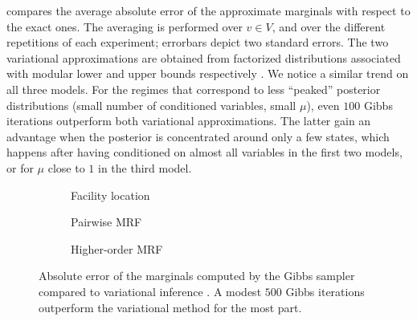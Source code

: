  compares the average absolute error of the approximate marginals with respect to the exact ones.
The averaging is performed over $v \in V$, and over the different repetitions of each experiment; errorbars depict two standard errors.
The two variational approximations are obtained from factorized distributions associated with modular lower and upper bounds respectively \cite{djolonga14}.
We notice a similar trend on all three models.
For the regimes that correspond to less ``peaked'' posterior distributions (small number of conditioned variables, small $\mu$), even $100$ Gibbs iterations outperform both variational approximations.
The latter gain an advantage when the posterior is concentrated around only a few states, which happens after having conditioned on almost all variables in the first two models, or for $\mu$ close to $1$ in the third model.

\setlength{}
\setlength{}
\newcommand{\subflen}{0.33\textwidth}
\newcommand{\scspacey}{-1.55em}
\newcommand{\scspacex}{0em}
\begin{figure}[tb]
  \begin{subfigure}[b]{\subflen}
    \centering
    
    \vspace{\scspacey}
    \caption{\hspace{\scspacex}Facility location}
    \label{fig:exp1}
  \end{subfigure}
  \begin{subfigure}[b]{\subflen}
    
    \vspace{\scspacey}
    \caption{\hspace{\scspacex}Pairwise MRF}
    \label{fig:exp2}
  \end{subfigure}
  \begin{subfigure}[b]{\subflen}
    
    \vspace{\scspacey}
    \caption{\hspace{\scspacex}Higher-order MRF}
    \label{fig:exp3}
  \end{subfigure}
  \caption{Absolute error of the marginals computed by the Gibbs sampler compared to variational inference \cite{djolonga14}.
  	A modest $500$ Gibbs iterations outperform the variational method for the most part.}
  \label{fig:exp}
\end{figure}


